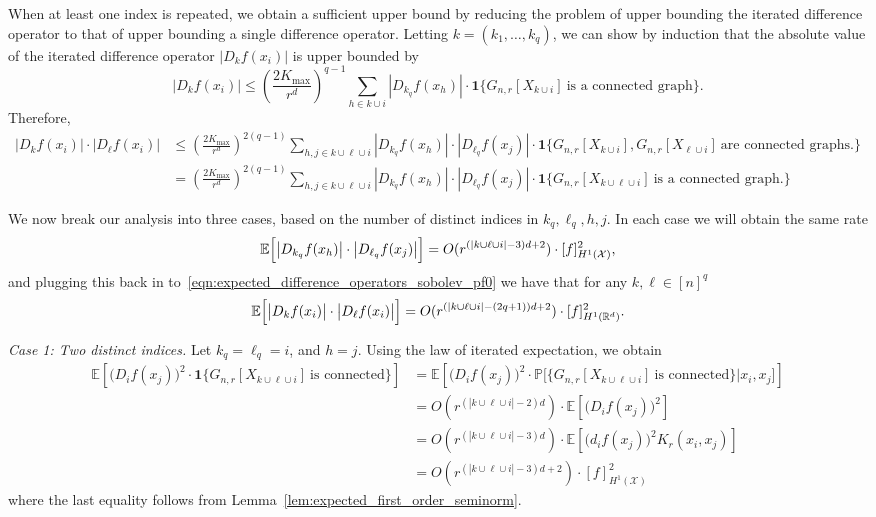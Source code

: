 \documentclass{article}
\newcommand{\Reals}{\mathbb{R}}
\newcommand{\abs}[1]{\left \lvert #1 \right \rvert}
\newcommand{\1}{\mathbf{1}}
\newcommand{\Rd}{\Reals^d}
\newcommand{\Xset}{\mathcal{X}}
\newcommand{\Pbb}{\mathbb{P}}
\newcommand{\Ebb}{\mathbb{E}}
\theoremstyle{alden}
\theoremstyle{aldenthm}
\theoremstyle{definition}
\theoremstyle{remark}
\begin{document}
When at least one index is repeated, we obtain a sufficient upper bound by reducing the problem of upper bounding the iterated difference operator to that of upper bounding a single difference operator. Letting $k = (k_1,\ldots,k_q)$, we can show by induction that the absolute value of the iterated difference operator $\abs{D_kf(x_i)}$ is upper bounded by
\begin{equation*}
\abs{D_kf(x_i)} \leq \left(\frac{2K_{\max}}{r^d}\right)^{q-1} \sum_{h \in k \cup i} \abs{D_{k_q}f(x_h)} \cdot \1\{G_{n,r}[X_{k \cup i}]~\textrm{is a connected graph} \}.
\end{equation*}
Therefore,
\begin{align}
\abs{D_kf(x_i)} \cdot \abs{D_{\ell}f(x_i)} & \leq \left(\frac{2K_{\max}}{r^d}\right)^{2(q - 1)} \sum_{h,j \in k \cup \ell \cup i} \abs{D_{k_q}f(x_h)} \cdot \abs{D_{\ell_q}f(x_j)} \cdot \1\{G_{n,r}[X_{k \cup i}], G_{n,r}[X_{\ell \cup i}]~\textrm{are connected graphs.} \} \nonumber \\
& =  \left(\frac{2K_{\max}}{r^d}\right)^{2(q - 1)} \sum_{h,j \in k \cup \ell \cup i} \abs{D_{k_q}f(x_h)} \cdot \abs{D_{\ell_q}f(x_j)} \cdot \1\{G_{n,r}[X_{k \cup \ell \cup i}] ~\textrm{is a connected graph.} \} \label{eqn:expected_difference_operators_sobolev_pf0}
\end{align}

We now break our analysis into three cases, based on the number of distinct indices in $k_q,\ell_q,h,j$. In each case we will obtain the same rate
\begin{equation*}
\Ebb\Bigl[\abs{D_{k_q}f(x_h)} \cdot \abs{D_{\ell_q}f(x_j)}\Bigr] = O(r^{(\abs{k \cup \ell \cup i} - 3)d + 2}) \cdot [f]_{H^1(\Xset)}^2,
\end{equation*}
and plugging this back in to~\eqref{eqn:expected_difference_operators_sobolev_pf0} we have that for any $k, \ell \in [n]^q$
\begin{equation*}
\Ebb\Bigl[\bigl|D_{k}f(x_i)\bigr| \cdot \bigl|D_{\ell}f(x_i)\bigr|\Bigr] = O(r^{(\abs{k \cup \ell \cup i} - (2q + 1))d + 2}) \cdot [f]_{H^1(\Rd)}^2.
\end{equation*}

\textit{Case 1: Two distinct indices.}
Let $k_q = \ell_q = i$, and $h = j$. Using the law of iterated expectation, we obtain
\begin{align*}
\Ebb \left[\bigl(D_{i}f(x_j)\bigr)^2 \cdot \1\{G_{n,r}[X_{k \cup \ell \cup i}] ~\textrm{is connected} \}\right] &= \Ebb \left[\bigl(D_{i}f(x_j)\bigr)^2 \cdot \Pbb\bigl[\{G_{n,r}[X_{k \cup \ell \cup i}] ~\textrm{is connected} \} |x_i,x_j\bigr]\right] \\
& = O(r^{(\abs{k \cup \ell \cup i} - 2)d}) \cdot \Ebb\left[\bigl(D_{i}f(x_j)\bigr)^2\right] \\
& = O(r^{(\abs{k \cup \ell \cup i} - 3)d}) \cdot \Ebb\left[\bigl(d_{i}f(x_j)\bigr)^2K_r(x_i,x_j)\right] \\
& = O(r^{(\abs{k \cup \ell \cup i} - 3)d + 2}) \cdot [f]_{H^1(\Xset)}^2
\end{align*}
where the last equality follows from Lemma~\ref{lem:expected_first_order_seminorm}.
\end{document}
